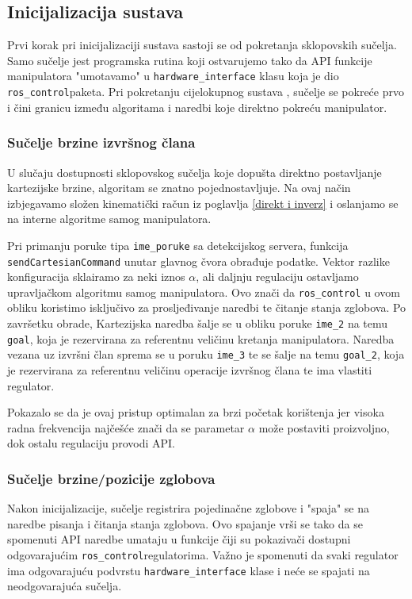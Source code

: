 \documentclass[times, utf8, diplomski, numeric]{fer}
\begin{document}
\subsection{Inicijalizacija sustava}
Prvi korak pri inicijalizaciji sustava sastoji se od pokretanja sklopovskih sučelja.
Samo sučelje jest programska rutina koji ostvarujemo tako da API funkcije manipulatora "umotavamo" u \verb|hardware_interface| klasu koja je dio \texttt{ros\_control}paketa.
Pri pokretanju cijelokupnog sustava , sučelje se pokreće prvo i čini granicu između algoritama i naredbi koje direktno pokreću manipulator.

\subsubsection{Sučelje brzine izvršnog člana}
U slučaju dostupnosti sklopovskog sučelja koje dopušta direktno postavljanje kartezijske brzine, algoritam se znatno pojednostavljuje.
Na ovaj način izbjegavamo složen kinematički račun iz poglavlja \ref{direkt i inverz} i oslanjamo se na interne algoritme samog manipulatora.

Pri primanju poruke tipa \texttt{ime\_poruke} sa detekcijskog servera, funkcija \\  \texttt{sendCartesianCommand} unutar glavnog čvora obrađuje podatke. 
Vektor razlike konfiguracija sklairamo za neki iznos $\alpha$, ali daljnju regulaciju ostavljamo upravljačkom algoritmu samog manipulatora.
Ovo znači da \texttt{ros\_control} u ovom obliku koristimo isključivo za prosljeđivanje naredbi te čitanje stanja zglobova.
Po završetku obrade, Kartezijska naredba šalje se u obliku poruke \verb|ime_2| na temu \verb|goal|, koja je rezervirana za referentnu veličinu kretanja manipulatora.
Naredba vezana uz izvršni član sprema se u poruku \verb|ime_3| te se šalje na temu \verb|goal_2|, koja je rezervirana za referentnu veličinu operacije izvršnog člana te ima vlastiti regulator.

Pokazalo se da je ovaj pristup optimalan za brzi početak korištenja jer visoka radna frekvencija najčešće znači da se parametar $\alpha$ može postaviti proizvoljno, dok ostalu regulaciju provodi API.

\subsubsection{Sučelje brzine/pozicije zglobova}
Nakon inicijalizacije, sučelje registrira pojedinačne zglobove i "spaja" se na naredbe pisanja i čitanja stanja zglobova.
Ovo spajanje vrši se tako da se spomenuti API naredbe umataju u funkcije čiji su pokazivači dostupni  odgovarajućim \texttt{ros\_control}regulatorima.
Važno je spomenuti da svaki regulator ima odgovarajuću podvrstu \texttt{hardware\_interface} klase i neće se spajati na neodgovarajuća sučelja.
\end{document}
